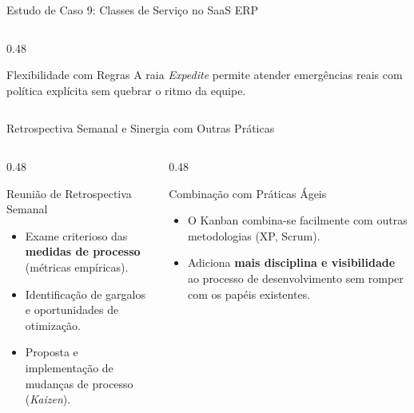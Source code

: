 \documentclass[aspectratio=169, 9pt]{beamer}
\begin{document}
\begin{frame}{Estudo de Caso 9: Classes de Serviço no SaaS ERP}
\begin{columns}[T]
    \begin{column}{0.48\textwidth}
      \begin{alertblock}{Flexibilidade com Regras}
        A raia \textit{Expedite} permite atender emergências reais com política explícita sem quebrar o ritmo da equipe.
      \end{alertblock}
    \end{column}
  \end{columns}
\end{frame}

\begin{frame}{Retrospectiva Semanal e Sinergia com Outras Práticas}
  \begin{columns}[T]
    \begin{column}{0.48\textwidth}
      \begin{block}{Reunião de Retrospectiva Semanal}
        \begin{itemize}
          \item Exame criterioso das \textbf{medidas de processo} (métricas empíricas).
          \item Identificação de gargalos e oportunidades de otimização.
          \item Proposta e implementação de mudanças de processo (\textit{Kaizen}).
        \end{itemize}
      \end{block}
    \end{column}

    \begin{column}{0.48\textwidth}
      \begin{exampleblock}{Combinação com Práticas Ágeis}
        \begin{itemize}
          \item O Kanban combina-se facilmente com outras metodologias (XP, Scrum).
          \item Adiciona \textbf{mais disciplina e visibilidade} ao processo de desenvolvimento sem romper com os papéis existentes.
        \end{itemize}
      \end{exampleblock}
    \end{column}
  \end{columns}
\end{frame}

\end{document}
